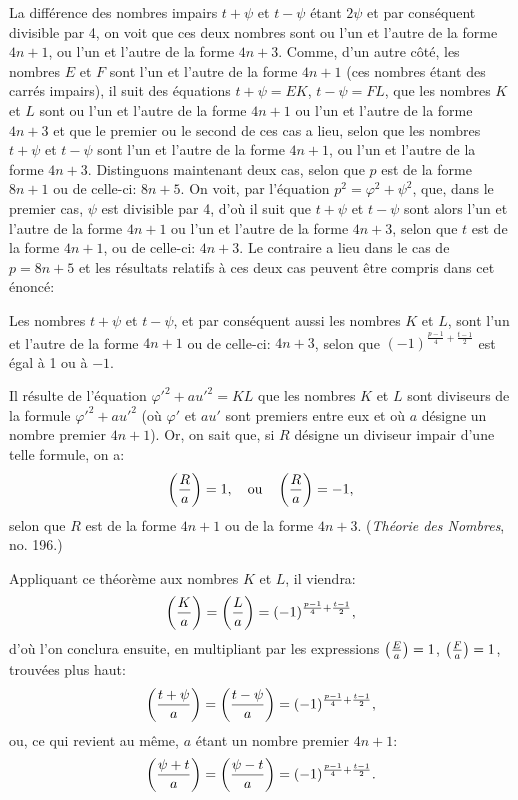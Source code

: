 \par\indent
La différence des nombres impairs $t+\psi$ et $t-\psi$ étant $2\psi$ et par
conséquent divisible par 4, on voit que ces deux nombres sont ou l'un et l'autre
de la forme $4n+1$, ou l'un et l'autre de la forme $4n+3$. Comme, d'un autre
côté, les nombres $E$ et $F$ sont l'un et l'autre de la forme $4n+1$ (ces nombres
étant des carrés impairs), il suit des équations $t+\psi=EK$, $t-\psi=FL$, que
les nombres $K$ et $L$ sont ou l'un et l'autre de la forme $4n+1$ ou l'un et l'autre
de la forme $4n+3$ et que le premier ou le second de ces cas a lieu, selon
que les nombres $t+\psi$ et $t-\psi$ sont l'un et l'autre de la forme $4n+1$, ou l'un
et l'autre de la forme $4n+3$. Distinguons maintenant deux cas, selon que $p$
est de la forme $8n+1$ ou de celle-ci: $8n+5$. On voit, par l'équation
$p^2=\varphi^2+\psi^2$, que, dans le premier cas, $\psi$ est divisible par 4, d'où il suit que
$t+\psi$ et $t-\psi$ sont alors l'un et l'autre de la forme $4n+1$ ou l'un et l'autre
de la forme $4n+3$, selon que $t$ est de la forme $4n+1$, ou de celle-ci: $4n+3$.
Le contraire a lieu dans le cas de $p=8n+5$ et les résultats relatifs à ces
deux cas peuvent être compris dans cet énoncé:
\par\indent
Les nombres $t+\psi$ et $t-\psi$, et par conséquent aussi les nombres $K$ et
$L$, sont l'un et l'autre de la forme $4n+1$ ou de celle-ci: $4n+3$, selon que
$(-1)^{\frac{p-1}{4}+\frac{t-1}{2}}$ est égal à 1 ou à $-1$.
\par\indent
Il résulte de l'équation $\varphi'^2+au'^2=KL$ que les nombres $K$ et $L$ sont
diviseurs de la formule $\varphi'^2+au'^2$ (où $\varphi'$ et $au'$ sont premiers entre eux et où
$a$ désigne un nombre premier $4n+1$). Or, on sait que, si $R$ désigne un
diviseur impair d'une telle formule, on a:
\[
\left(\frac{R}{a}\right)=1,\quad\text{ou}\quad\left(\frac{R}{a}\right)=-1,
\]
selon que $R$ est de la forme $4n+1$ ou de la forme $4n+3$. (\emph{Théorie des
Nombres}, no. 196.)
\par\indent
Appliquant ce théorème aux nombres $K$ et $L$, il viendra:
\[
\left(\frac{K}{a}\right)=\left(\frac{L}{a}\right)=(-1)^{\frac{p-1}{4}+\frac{t-1}{2}},
\]
d'où l'on conclura ensuite, en multipliant par les expressions $\left(\frac{E}{a}\right)=1$,
$\left(\frac{F}{a}\right)=1$, trouvées plus haut:
\[
\left(\frac{t+\psi}{a}\right)=\left(\frac{t-\psi}{a}\right)=(-1)^{\frac{p-1}{4}+\frac{t-1}{2}},
\]
ou, ce qui revient au même, $a$ étant un nombre premier $4n+1$:
\[
\left(\frac{\psi+t}{a}\right)=\left(\frac{\psi-t}{a}\right)=(-1)^{\frac{p-1}{4}+\frac{t-1}{2}}.
\]
